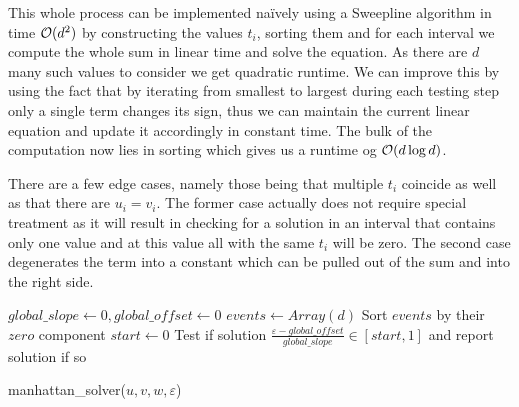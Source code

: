 This whole process can be implemented na\"ively using a Sweepline algorithm in time \(\mathcal{O}(d^2)\) by constructing the values \(t_i\), sorting them and for each interval we compute the whole sum in linear time and solve the equation. As there are \(d\) many such values to consider we get quadratic runtime. We can improve this by using the fact that by iterating from smallest to largest during each testing step only a single term changes its sign, thus we can maintain the current linear equation and update it accordingly in constant time. The bulk of the computation now lies in sorting which gives us a runtime og \(\mathcal{O}(d \log d)\). 

There are a few edge cases, namely those being that multiple \(t_i\) coincide as well as that there are \(u_i = v_i\). The former case actually does not require special treatment as it will result in checking for a solution in an interval that contains only one value and at this value all with the same \(t_i\) will be zero. The second case degenerates the term into a constant which can be pulled out of the sum and into the right side.

\begin{algorithm}[ht]
  \DontPrintSemicolon
  \BlankLine
  \(global\_slope \gets 0, global\_offset \gets 0\) \;
  \(events \gets Array(d)\)
  Sort \(events\) by their \(zero\) component\;
  \(start \gets 0\)\;
  Test if solution \(\frac{\varepsilon - global\_offset}{global\_slope} \in [start, 1]\) and report solution if so\;

  \caption{manhattan\_solver(\(u, v, w, \varepsilon\))}
  \label{algo:solve_manhattan}
\end{algorithm}


